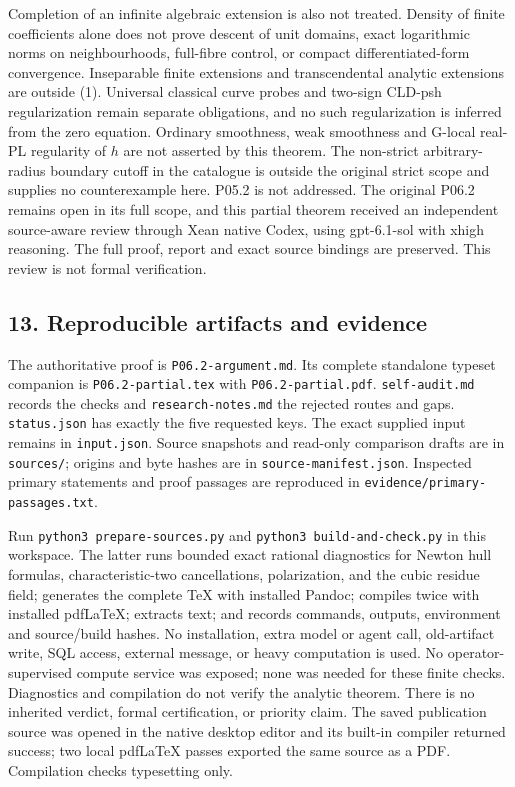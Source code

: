 \documentclass[11pt]{article}
\begin{document}
Completion of an infinite algebraic extension is also not treated.
Density of finite coefficients alone does not prove descent of unit
domains, exact logarithmic norms on neighbourhoods, full-fibre control,
or compact differentiated-form convergence. Inseparable finite
extensions and transcendental analytic extensions are outside (1).
Universal classical curve probes and two-sign CLD-psh regularization
remain separate obligations, and no such regularization is inferred from
the zero equation. Ordinary smoothness, weak smoothness and G-local
real-PL regularity of \(h\) are not asserted by this theorem. The
non-strict arbitrary-radius boundary cutoff in the catalogue is outside
the original strict scope and supplies no counterexample here. P05.2 is
not addressed. The original P06.2 remains open in its full scope, and
this partial theorem received an independent source-aware review
through Xean native Codex, using gpt-6.1-sol with xhigh reasoning.
The full proof, report and exact source bindings are preserved.
This review is not formal verification.

\subsection{13. Reproducible artifacts and
evidence}\label{reproducible-artifacts-and-evidence}

The authoritative proof is \texttt{P06.2-argument.md}. Its complete
standalone typeset companion is \texttt{P06.2-partial.tex} with
\texttt{P06.2-partial.pdf}. \texttt{self-audit.md} records the checks
and \texttt{research-notes.md} the rejected routes and gaps.
\texttt{status.json} has exactly the five requested keys. The exact
supplied input remains in \texttt{input.json}. Source snapshots and
read-only comparison drafts are in \texttt{sources/}; origins and byte
hashes are in \texttt{source-manifest.json}. Inspected primary
statements and proof passages are reproduced in
\texttt{evidence/primary-passages.txt}.

Run \texttt{python3\ prepare-sources.py} and
\texttt{python3\ build-and-check.py} in this workspace. The latter runs
bounded exact rational diagnostics for Newton hull formulas,
characteristic-two cancellations, polarization, and the cubic residue
field; generates the complete TeX with installed Pandoc; compiles twice
with installed pdfLaTeX; extracts text; and records commands, outputs,
environment and source/build hashes. No installation, extra model or
agent call, old-artifact write, SQL access, external message, or heavy
computation is used. No operator-supervised compute service was exposed;
none was needed for these finite checks. Diagnostics and compilation do
not verify the analytic theorem. There is no inherited verdict, formal
certification, or priority claim. The saved publication source was
opened in the native desktop editor and its built-in compiler returned
success; two local pdfLaTeX passes exported the same source as a PDF.
Compilation checks typesetting only.
\end{document}
